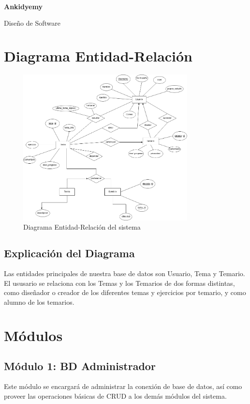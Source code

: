 \documentclass{report}
\begin{document}
\begin{titlepage}
    \centering
    \vfill
    {\Huge\bfseries Ankidyemy}\par
    \vspace{1cm}
    {\LARGE Diseño de Software}\par
    \vfill
\end{titlepage}

\chapter{Diagrama Entidad-Relación}
\begin{figure}[H]
    \centering
    \includegraphics[width=0.8\textwidth]{./Diagramas/Diagrama-ER.png}
    \caption{Diagrama Entidad-Relación del sistema}
    \label{fig:er}
\end{figure}

\section{Explicación del Diagrama}
Las entidades principales de nuestra base de datos son Usuario, Tema y Temario. El ususario se relaciona con los Temas y los Temarios de dos formas distintas, como diseñador o creador de los diferentes temas y ejercicios por temario, y como alumno de los temarios.

\chapter{Módulos}

\section{Módulo 1: BD Administrador}
Este módulo se encargará de administrar la conexión de base de datos, así como proveer las operaciones básicas de CRUD a los demás módulos del sistema.
\end{document}
